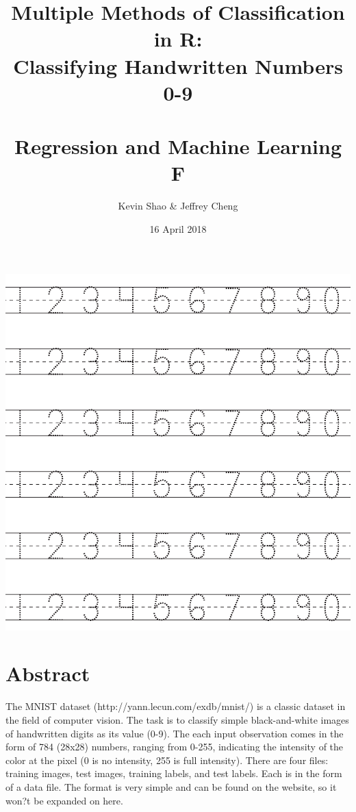 \documentclass[10pt]{extarticle}
\title{Multiple Methods of Classification in R:\\ Classifying Handwritten Numbers 0-9\\\textrm{ }\\\large Regression and Machine Learning F}
\date{16 April 2018}
\author{Kevin Shao \& Jeffrey Cheng}
\begin{document}
\allowdisplaybreaks
{}
\renewcommand{\labelitemi}{$>$}
\maketitle
\begin{center}

\includegraphics[scale=0.5]{numbers.png}

\end{center}
\newpage
\noindent {}

\section{Abstract}

The MNIST dataset (http://yann.lecun.com/exdb/mnist/) is a classic dataset in the field of computer vision. The task is to classify simple black-and-white images of handwritten digits as its value (0-9). The each input observation comes in the form of 784 (28x28) numbers, ranging from 0-255, indicating the intensity of the color at the pixel (0 is no intensity, 255 is full intensity). There are four files: training images, test images, training labels, and test labels. Each is in the form of a data file. The format is very simple and can be found on the website, so it won?t be expanded on here. 
\end{document}
